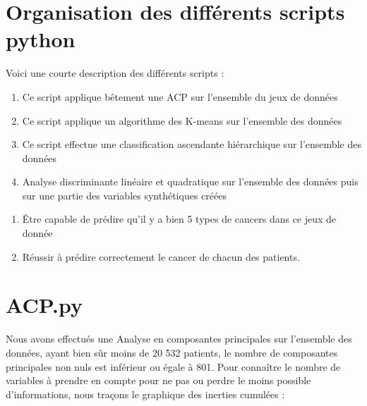 \documentclass[12pt,a4paper]{article}
\begin{document}
	\section{Organisation des différents scripts python}
	
	Voici une courte description des différents scripts : \\
	\hspace*{5cm}\begin{minipage}[t]{15cm}
		\begin{enumerate}
		\item[\textbf{ACP.py :}] Ce script applique bêtement une ACP sur l'ensemble du jeux de données
		
		\item[\textbf{K-means.py :}] Ce script applique un algorithme des K-means sur l'ensemble des données
		
		\item[\textbf{CAH.py :}] Ce script effectue une classification ascendante hiérarchique sur l'ensemble des données
		
		\item[\textbf{Analyse$\_$Discriminante.py :}] Analyse discriminante linéaire et quadratique sur l'ensemble des données puis sur une partie des variables synthétiques créées
	\end{enumerate}
	\end{minipage}	
		
	\begin{tcolorbox}[title=\textbf{Objectifs}]
		\begin{enumerate}
			\item Être capable de prédire qu'il y a bien 5 types de cancers dans ce jeux de donnée 
			\item Réussir à prédire correctement le cancer de chacun des patients.
		\end{enumerate}
	\end{tcolorbox}	
	
	\section{ACP.py}
	
	Nous avons effectués une Analyse en composantes principales sur l'ensemble des données, ayant bien sûr moins de 20 532 patients, le nombre de composantes principales non nuls est inférieur ou égale à 801. Pour connaître le nombre de variables à prendre en compte pour ne pas ou perdre le moins possible d'informations, nous traçons le graphique des inerties cumulées :
	
\end{document}
